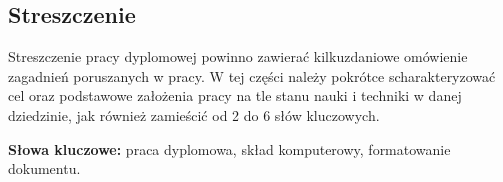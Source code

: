 
\subsection*{Streszczenie}

Streszczenie pracy dyplomowej powinno zawierać kilkuzdaniowe omówienie zagadnień poruszanych w pracy. W tej części  należy pokrótce scharakteryzować cel oraz podstawowe założenia pracy na tle stanu nauki i techniki w danej dziedzinie, jak również zamieścić od 2 do 6 słów kluczowych.



\vspace{1cm}
\noindent\textbf{Słowa kluczowe:} praca dyplomowa, skład komputerowy, formatowanie dokumentu.